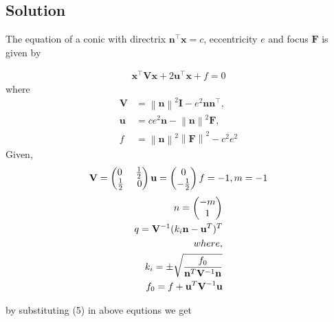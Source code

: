 \documentclass{article}
\providecommand{\norm}[1]{\left\lVert#1\right\rVert}
\let\vec\mathbf
\begin{document}
\begin{multicols}{2}
\section*{Solution}
\begin{flushleft}
The equation of  a conic with directrix $\vec{n}^{\top}\vec{x} = c$, eccentricity $e$ and focus $\vec{F}$ is given by 
\end{flushleft}
\begin{align}
    \vec{x}^{\top}\vec{V}\vec{x}+2\vec{u}^{\top}\vec{x}+f=0
    \end{align}
\hspace{-6.5cm}where     
\begin{align}
  \label{eq:conic_quad_form_v}
\vec{V} &=\norm{\vec{n}}^2\vec{I}-e^2\vec{n}\vec{n}^{\top}, 
\\
\label{eq:conic_quad_form_u}
\vec{u} &= ce^2\vec{n}-\norm{\vec{n}}^2\vec{F}, 
\\
  f &= \norm{\vec{n}}^2\norm{\vec{F}}^2-c^2e^2
\end{align}
\hspace{-6.5cm}Given, 
\begin{align}
	\vec{V}
	=\begin{pmatrix}
	0\hspace{0.5cm} \frac{1}{2}\\\frac{1}{2}\hspace{0.5cm} 0\\
	\end{pmatrix}
\vec{u} = \begin{pmatrix}
0 \\-\frac{1}{2}\\
\end{pmatrix}  f = -1, m=-1
	\label{eq:matrix-10-13-param}
\end{align}
\begin{align*}
n=\begin{pmatrix}
-m \\ 1\\
\end{pmatrix}\\
q=\vec{V}^{-1}(k_i\vec{n}-\vec{u}^T)^T \\
\vspace{-6cm}where,\\
k_i=\pm \sqrt{\frac{f_0}{\vec{n}^T\vec{V}^{-1}\vec{n}}}\\
f_0=f+\vec{u}^T\vec{V}^{-1}\vec{u}
\end{align*}
\begin{flushleft}
by substituting (5) in above equtions we get\\

\end{flushleft}
\end{multicols}
\end{document}
